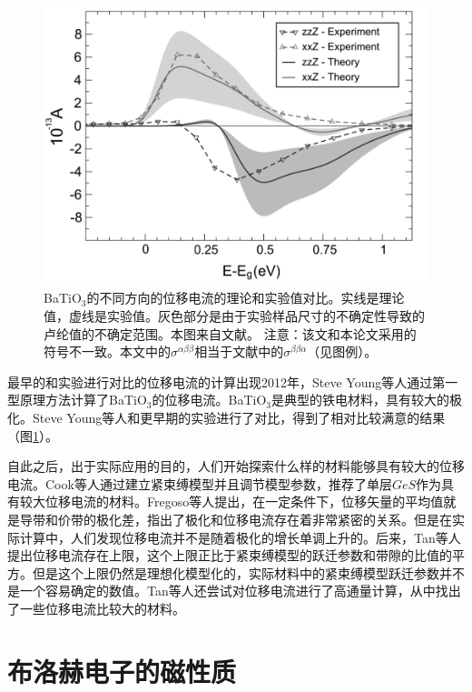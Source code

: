\begin{figure}
\includegraphics[width=1.0\textwidth]{../figures/young-shift.png}
\caption{BaTiO$_3$的不同方向的位移电流的理论和实验值\cite{koch_anomalous_1976}对比。实线是理论值，虚线是实验值。灰色部分是由于实验样品尺寸的不确定性导致的卢纶值的不确定范围。本图来自文献。 注意：该文和本论文采用的符号不一致。本文中的$\sigma^{\alpha\beta\beta}$相当于文献中的$\sigma^{\beta\beta\alpha}$（见图例）。\label{young-shift}}
\end{figure}

最早的和实验进行对比的位移电流的计算出现2012年，Steve Young等人\cite{young2012}通过第一型原理方法计算了BaTiO$_3$的位移电流。BaTiO$_3$是典型的铁电材料，具有较大的极化。Steve Young等人和更早期的实验进行了对比，得到了相对比较满意的结果（图\ref{young-shift}）。

自此之后，出于实际应用的目的，人们开始探索什么样的材料能够具有较大的位移电流。Cook等人\cite{cook_design_2017}通过建立紧束缚模型并且调节模型参数，推荐了单层$GeS$作为具有较大位移电流的材料。Fregoso等人\cite{fregoso_quantitative_2016}提出，在一定条件下，位移矢量的平均值就是导带和价带的极化差，指出了极化和位移电流存在着非常紧密的关系。但是在实际计算中，人们发现位移电流并不是随着极化的增长单调上升的。后来，Tan等人\cite{tan_upper_2017}提出位移电流存在上限，这个上限正比于紧束缚模型的跃迁参数和带隙的比值的平方。但是这个上限仍然是理想化模型化的，实际材料中的紧束缚模型跃迁参数并不是一个容易确定的数值。Tan等人还尝试对位移电流进行了高通量计算，从中找出了一些位移电流比较大的材料。


\section{布洛赫电子的磁性质}

